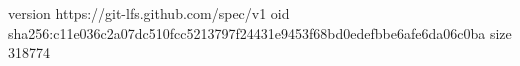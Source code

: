 version https://git-lfs.github.com/spec/v1
oid sha256:c11e036c2a07dc510fcc5213797f24431e9453f68bd0edefbbe6afe6da06c0ba
size 318774
